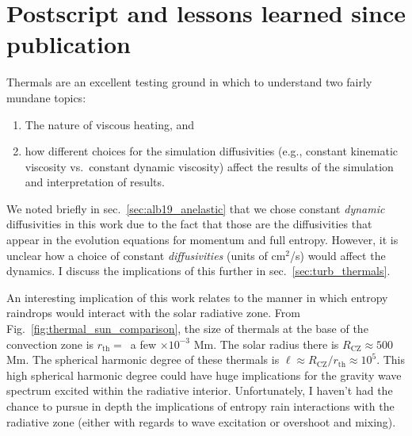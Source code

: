 \section{Postscript and lessons learned since publication}
\label{sec:alb19_postscript}
Thermals are an excellent testing ground in which to understand two fairly mundane topics:
\begin{enumerate}
\item The nature of viscous heating, and
\item how different choices for the simulation diffusivities (e.g., constant kinematic viscosity vs.~constant dynamic viscosity) affect the results of the simulation and interpretation of results.
\end{enumerate}
We noted briefly in sec.~\ref{sec:alb19_anelastic} that we chose constant \emph{dynamic} diffusivities in this work due to the fact that those are the diffusivities that appear in the evolution equations for momentum and full entropy.
However, it is unclear how a choice of constant \emph{diffusivities} (units of cm$^2$/s) would affect the dynamics.
I discuss the implications of this further in sec.~\ref{sec:turb_thermals}.

An interesting implication of this work relates to the manner in which entropy raindrops would interact with the solar radiative zone.
From Fig.~\ref{fig:thermal_sun_comparison}, the size of thermals at the base of the convection zone is $r_{\text{th}} =\,$ a few $\times 10^{-3}$ Mm.
The solar radius there is $R_{\text{CZ}} \approx 500$ Mm.
The spherical harmonic degree of these thermals is $\ell \approx R_{\text{CZ}}/ r_{\text{th}} \approx 10^{5}$.
This high spherical harmonic degree could have huge implications for the gravity wave spectrum excited within the radiative interior.
Unfortunately, I haven't had the chance to pursue in depth the implications of entropy rain interactions with the radiative zone (either with regards to wave excitation or overshoot and mixing).
